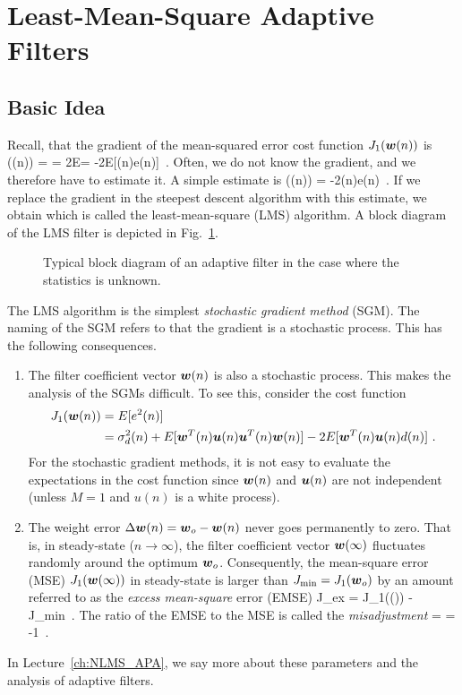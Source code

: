 \section{Least-Mean-Square Adaptive Filters}
\subsection{Basic Idea}
Recall, that the gradient of the mean-squared error cost function $J_1(\boldsymbol{w}(n))$ is
\bmath
  ((n)) =  = 2E = -2E[(n)e(n)]\ .
\emath
Often, we do not know the gradient, and we therefore have to estimate it. A simple estimate is
\bmath
  ((n)) = -2(n)e(n)\ .
\emath
If we replace the gradient in the steepest descent algorithm with this estimate, we obtain
\bmath
\emath
which is called the least-mean-square (LMS) algorithm. A block diagram of the LMS filter is depicted in Fig.~\ref{eq:block_diagram_w_feedback}.
\begin{figure}[htbp]
  \centering
  \caption{Typical block diagram of an adaptive filter in the case where the statistics is unknown.}
  \label{eq:block_diagram_w_feedback}
\end{figure}
The LMS algorithm is the simplest \textit{stochastic gradient method} (SGM). The naming of the SGM refers to that the gradient is a stochastic process. This has the following consequences.
\begin{enumerate}
  \item The filter coefficient vector $\boldsymbol{w}(n)$ is also a stochastic process. This makes the analysis of the SGMs difficult. To see this, consider the cost function
\begin{align}
  J_1(\vect{w}(n)) &= E[e^2(n)]\notag\\
  &= \sigma_d^2(n) + E[\vect{w}^T(n)\vect{u}(n)\vect{u}^T(n)\vect{w}(n)]-2E[\vect{w}^T(n)\vect{u}(n)d(n)]\ .
\end{align}
For the stochastic gradient methods, it is not easy to evaluate the expectations in the cost function since $\boldsymbol{w}(n)$ and $\boldsymbol{u}(n)$ are not independent (unless $M=1$ and $u(n)$ is a white process).
  \item The weight error $\Delta\boldsymbol{w}(n)=\boldsymbol{w}_o-\boldsymbol{w}(n)$ never goes permanently to zero. That is, in steady-state ($n\to\infty$), the filter coefficient vector $\boldsymbol{w}(\infty)$ fluctuates randomly around the optimum $\boldsymbol{w}_o$. Consequently, the mean-square error (MSE) $J_1(\boldsymbol{w}(\infty))$ in steady-state is larger than $J_\textup{min} = J_1(\boldsymbol{w}_o)$ by an amount referred to as the \textit{excess mean-square} error (EMSE)
  \bmath
    J_\textup{ex} = J_1((\infty)) - J_\textup{min}\ .
  \emath
  The ratio of the EMSE to the MSE is called the \textit{misadjustment}
  \bmath
     =  = -1\ .
  \emath
\end{enumerate}
In Lecture~\ref{ch:NLMS_APA}, we say more about these parameters and the analysis of adaptive filters.


